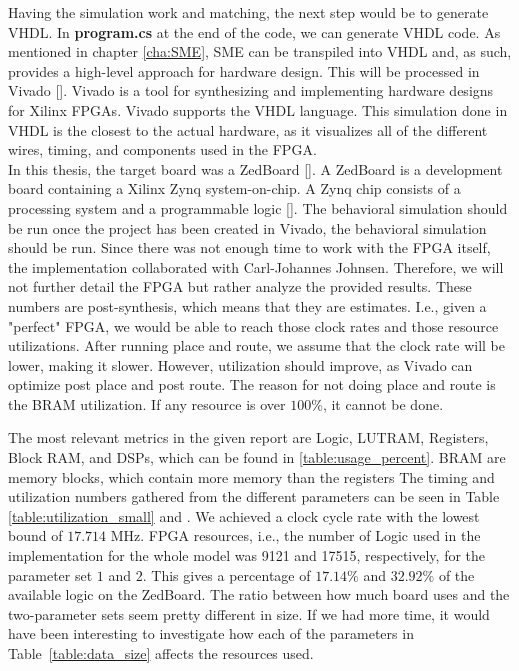 Having the simulation work and matching, the next step would be to generate \acrshort{VHDL}. In \textbf{program.cs} at the end of the code, we can generate VHDL code. As mentioned in chapter \ref{cha:SME}, SME can be transpiled into VHDL and, as such, provides a high-level approach for hardware design. This will be processed in Vivado [\cite{ref:vivado}]. 
Vivado is a tool for synthesizing and implementing hardware designs for Xilinx FPGAs. Vivado supports the VHDL language.
This simulation done in VHDL is the closest to the actual hardware, as it visualizes all of the different wires, timing, and components used in the FPGA. \\

In this thesis, the target board was a ZedBoard [\cite{Zedboard}].
A ZedBoard is a development board containing a Xilinx Zynq system-on-chip. A Zynq chip consists of a processing system and a programmable logic [\cite{zynq}]. The behavioral simulation should be run once the project has been created in Vivado, the behavioral simulation
should be run. Since there was not enough time to work with the FPGA itself, the implementation collaborated with Carl-Johannes Johnsen. Therefore, we will not further detail the FPGA but rather analyze the provided results.
These numbers are post-synthesis, which means that they are estimates. I.e., given a "perfect" FPGA, we would be able to reach those clock rates and those resource utilizations. After running place and route, we assume that the clock rate will be lower, making it slower. However, utilization should improve, as Vivado can optimize post place and post route. The reason for not doing place and route is the BRAM utilization. If any resource is over $100\%$, it cannot be done.

The most relevant metrics in the given report are Logic, LUTRAM, Registers, Block RAM, and DSPs, which can be found in \ref{table:usage_percent}.
\acrshort{BRAM} are memory blocks, which contain more memory than the registers
The timing and utilization numbers gathered from the different parameters can be seen in Table \ref{table:utilization_small} and \label{table:utilization_acutal}. We achieved a clock cycle rate with the lowest bound of $17.714$ MHz. FPGA resources, i.e., the number of Logic used in the implementation for the whole model was 9121 and 17515, respectively, for the parameter set $1$ and $2$. This gives a percentage of $17.14\%$ and $32.92\%$ of the available logic on the ZedBoard. The ratio between how much board uses and the two-parameter sets seem pretty different in size. If we had more time, it would have been interesting to investigate how each of the parameters in Table~\ref{table:data_size} affects the resources used. \\

